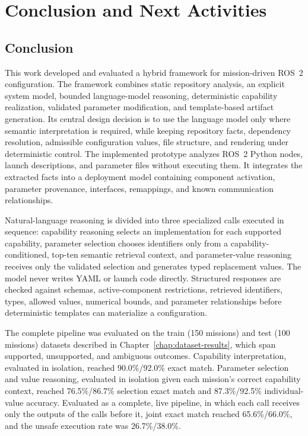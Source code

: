 \chapter{Conclusion and Next Activities}

\section{Conclusion}
This work developed and evaluated a hybrid framework for mission-driven ROS~2 configuration. The framework combines static repository analysis, an explicit system model, bounded language-model reasoning, deterministic capability realization, validated parameter modification, and template-based artifact generation. Its central design decision is to use the language model only where semantic interpretation is required, while keeping repository facts, dependency resolution, admissible configuration values, file structure, and rendering under deterministic control. The implemented prototype analyzes ROS~2 Python nodes, launch descriptions, and parameter files without executing them. It integrates the extracted facts into a deployment model containing component activation, parameter provenance, interfaces, remappings, and known communication relationships.

Natural-language reasoning is divided into three specialized calls executed in sequence: capability reasoning selects an implementation for each supported capability, parameter selection chooses identifiers only from a capability-conditioned, top-ten semantic retrieval context, and parameter-value reasoning receives only the validated selection and generates typed replacement values. The model never writes YAML or launch code directly. Structured responses are checked against schemas, active-component restrictions, retrieved identifiers, types, allowed values, numerical bounds, and parameter relationships before deterministic templates can materialize a configuration.

The complete pipeline was evaluated on the train (150 missions) and test (100 missions) datasets described in Chapter~\ref{chap:dataset-results}, which span supported, unsupported, and ambiguous outcomes. Capability interpretation, evaluated in isolation, reached 90.0\%/92.0\% exact match. Parameter selection and value reasoning, evaluated in isolation given each mission's correct capability context, reached 76.5\%/86.7\% selection exact match and 87.3\%/92.5\% individual-value accuracy. Evaluated as a complete, live pipeline, in which each call receives only the outputs of the calls before it, joint exact match reached 65.6\%/66.0\%, and the unsafe execution rate was 26.7\%/38.0\%.

